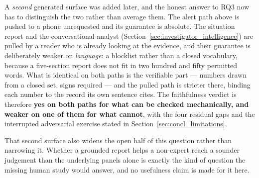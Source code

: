 A \emph{second} generated surface was added later, and the honest answer to RQ3 now has to
distinguish the two rather than average them. The alert path above is pushed to a phone unrequested
and its guarantee is absolute. The situation report and the conversational analyst
(Section~\ref{sec:investigator_intelligence}) are pulled by a reader who is already looking at the
evidence, and their guarantee is deliberately weaker on \emph{language}: a blocklist rather than a
closed vocabulary, because a five-section report does not fit in two hundred and fifty permitted
words. What is identical on both paths is the verifiable part --- numbers drawn from a closed set,
signs required --- and the pulled path is stricter there, binding each number to the record its own
sentence cites. The faithfulness verdict is therefore \textbf{yes on both paths for what can be
checked mechanically, and weaker on one of them for what cannot}, with the four residual gaps and
the interrupted adversarial exercise stated in Section~\ref{sec:concl_limitations}.

That second surface also widens the open half of this question rather than narrowing it. Whether a
grounded report helps a non-expert reach a sounder judgement than the underlying panels alone is
exactly the kind of question the missing human study would answer, and no usefulness claim is made
for it here.


